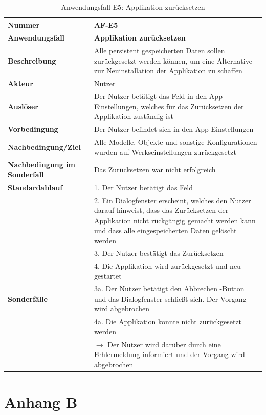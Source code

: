\documentclass[oneside]{ausarbeitung}
\begin{document}
\begin{table}[htbp]
	\centering
	\begin{tabular}{|l|p{80mm}|}
		\hline
		\textbf{Nummer} & \textbf{AF-E5} \\ \hline
		\textbf{Anwendungsfall} & \textbf{Applikation zurücksetzen} \\ \hline
		\textbf{Beschreibung} & Alle persistent gespeicherten Daten sollen zurückgesetzt werden können, um eine Alternative zur Neuinstallation der Applikation zu schaffen\\ \hline
		\textbf{Akteur} & Nutzer \\ \hline
		\textbf{Auslöser} & Der Nutzer betätigt das Feld in den App-Einstellungen, welches für das Zurücksetzen der Applikation zuständig ist \\ \hline
		\textbf{Vorbedingung} & Der Nutzer befindet sich in den App-Einstellungen\\ \hline
		\textbf{Nachbedingung/Ziel} & Alle Modelle, Objekte und sonstige Konfigurationen wurden auf Werkseinstellungen zurückgesetzt \\ \hline
		\textbf{Nachbedingung im Sonderfall} & Das Zurücksetzen war nicht erfolgreich \\ \hline
		\textbf{Standardablauf} & 1. Der Nutzer betätigt das Feld \\
		& 2. Ein Dialogfenster erscheint, welches den Nutzer darauf hinweist, dass das Zurücksetzen der Applikation nicht rückgängig gemacht werden kann und dass alle eingespeicherten Daten gelöscht werden \\ 
		& 3. Der Nutzer bestätigt das Zurücksetzen \\
		& 4. Die Applikation wird zurückgesetzt und neu gestartet \\ \hline
		\textbf{Sonderfälle} & 3a. Der Nutzer betätigt den \glqq Abbrechen \grqq-Button und das Dialogfenster schließt sich. Der Vorgang wird abgebrochen \\
		& 4a. Die Applikation konnte nicht zurückgesetzt werden \\ & $\rightarrow$ Der Nutzer wird darüber durch eine Fehlermeldung informiert und der Vorgang wird abgebrochen \\ \hline
		
	\end{tabular}
	\caption{Anwendungsfall E5: Applikation zurücksetzen}
	\label{tab:use-case-reset}
\end{table}

\chapter{Anhang B}
\end{document}
